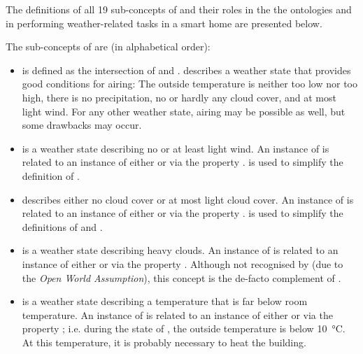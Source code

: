 The definitions of all \num{19} sub-concepts of  and their roles in the the ontologies and in performing weather-related tasks in a smart home are presented below.

The sub-concepts of  are (in alphabetical order):

\begin{itemize}
  \item {} is defined as the intersection of  and .  describes a weather state that provides good conditions for airing: The outside temperature is neither too low nor too high, there is no precipitation, no or hardly any cloud cover, and at most light wind. For any other weather state, airing may be possible as well, but some drawbacks may occur.
  
  \item {} is a weather state describing no or at least light wind. An instance of  is related to an instance of either  or  via the property .  is used to simplify the definition of .
  
  \item {} describes either no cloud cover or at most light cloud cover. An instance of  is related to an instance of either  or  via the property .  is used to simplify the definitions of  and .
  
  \item {} is a weather state describing heavy clouds. An instance of  is related to an instance of either  or  via the property . Although not recognised by  (due to the \emph{Open World Assumption}), this concept is the de-facto complement of .
  
  \item {} is a weather state describing a temperature that is far below room temperature. An instance of  is related to an instance of either  or  via the property ; i.e. during the state of , the outside temperature is below \SI{10}{\celsius}. At this temperature, it is probably necessary to heat the building.
  

\end{itemize}
